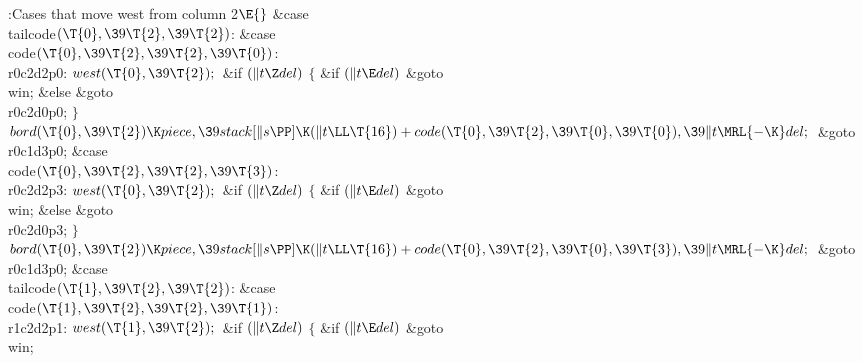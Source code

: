 \B{}:Cases that move west from column 2\X${}\E{}$%
\6
\4\&{case} \\{tailcode}${}(\T{0},\39\T{2},\39\T{2}){}$:\5
\&{case} \\{code}${}(\T{0},\39\T{2},\39\T{2},\39\T{0}){}$:\5
\\{r0c2d2p0}:\5
${}\\{west}(\T{0},\39\T{2});{}$\6
\&{if} ${}(\|t\Z\\{del}){}$\5
${}\{{}$\5
\1\&{if} ${}(\|t\E\\{del}){}$\1\5
\&{goto} \\{win};\5
\2\&{else}\1\5
\&{goto} \\{r0c2d0p0};\5
\2${}\}{}$\2\6
${}\\{bord}(\T{0},\39\T{2})\K\\{piece},\39\\{stack}[\|s\PP]\K(\|t\LL\T{16})+%
\\{code}(\T{0},\39\T{2},\39\T{0},\39\T{0}),\39\|t\MRL{-{\K}}\\{del};{}$\6
\&{goto} \\{r0c1d3p0};\6
\4\&{case} \\{code}${}(\T{0},\39\T{2},\39\T{2},\39\T{3}){}$:\5
\\{r0c2d2p3}:\5
${}\\{west}(\T{0},\39\T{2});{}$\6
\&{if} ${}(\|t\Z\\{del}){}$\5
${}\{{}$\5
\1\&{if} ${}(\|t\E\\{del}){}$\1\5
\&{goto} \\{win};\5
\2\&{else}\1\5
\&{goto} \\{r0c2d0p3};\5
\2${}\}{}$\2\6
${}\\{bord}(\T{0},\39\T{2})\K\\{piece},\39\\{stack}[\|s\PP]\K(\|t\LL\T{16})+%
\\{code}(\T{0},\39\T{2},\39\T{0},\39\T{3}),\39\|t\MRL{-{\K}}\\{del};{}$\6
\&{goto} \\{r0c1d3p0};\6
\4\&{case} \\{tailcode}${}(\T{1},\39\T{2},\39\T{2}){}$:\5
\&{case} \\{code}${}(\T{1},\39\T{2},\39\T{2},\39\T{1}){}$:\5
\\{r1c2d2p1}:\5
${}\\{west}(\T{1},\39\T{2});{}$\6
\&{if} ${}(\|t\Z\\{del}){}$\5
${}\{{}$\5
\1\&{if} ${}(\|t\E\\{del}){}$\1\5
\&{goto} \\{win};\5
